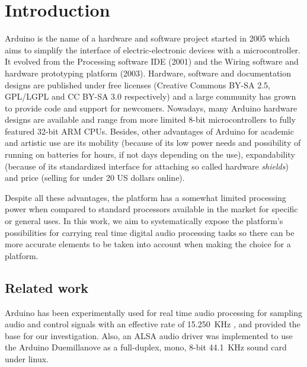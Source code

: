 
\section{Introduction}


Arduino is the name of a hardware and software project started in 2005 which
aims to simplify the interface of electric-electronic devices with a
microcontroller. It evolved from the Processing software IDE (2001) and the
Wiring software and hardware prototyping platform (2003). Hardware, software
and documentation designs are published under free licenses (Creative Commons
BY-SA 2.5, GPL/LGPL and CC BY-SA 3.0 respectively) and a large community has
grown to provide code and support for newcomers. Nowadays, many Arduino
hardware designs are available and range from more limited 8-bit
microcontrollers to fully featured 32-bit ARM CPUs. Besides, other
advantages of Arduino for academic and artistic use are its mobility (because
of its low power needs and possibility of running on batteries for hours, if
not days depending on the use), expandability (because of its standardized
interface for attaching so called hardware \emph{shields}) and price (selling
for under 20 US dollars online).

Despite all these advantages, the platform has a somewhat limited processing
power when compared to standard processors available in the market for
specific or general uses. In this work, we aim to systematically expose the
platform's possibilities for carrying real time digital audio processing tasks
so there can be more accurate elements to be taken into account when making
the choice for a platform.


\subsection{Related work}

Arduino has been experimentally used for real time audio processing for sampling audio and control signals with an effective rate of 15.250~KHz \cite{arduinodsp}, and provided the base for our investigation. Also, an ALSA audio driver was implemented to use the Arduino Duemillanove \cite{Dimitrov:2011} as a full-duplex, mono, 8-bit 44.1~KHz sound card under linux.


